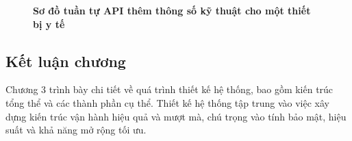 \begin{figure}[H]
	\centering
	\caption[Sơ đồ tuần tự API thêm thông số kỹ thuật cho nột thiết bị y tế]{\bfseries \fontsize{12pt}{0pt}\selectfont Sơ đồ tuần tự API thêm thông số kỹ thuật cho một thiết bị y tế}
	\label{sequence_diagram_add_device}
\end{figure}

\subsection{Kết luận chương}

Chương 3 trình bày chi tiết về quá trình thiết kế hệ thống, bao gồm kiến trúc tổng thể và các thành phần cụ thể.
Thiết kế hệ thống tập trung vào việc xây dựng kiến trúc vận hành hiệu quả và mượt mà, chú trọng vào tính bảo mật, hiệu suất và khả năng mở rộng tối ưu.
\newpage